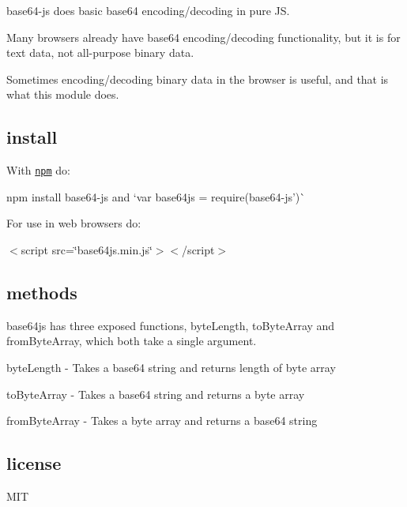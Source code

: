 {\ttfamily base64-\/js} does basic base64 encoding/decoding in pure JS.

\href{http://travis-ci.org/beatgammit/base64-js}{\tt }

Many browsers already have base64 encoding/decoding functionality, but it is for text data, not all-\/purpose binary data.

Sometimes encoding/decoding binary data in the browser is useful, and that is what this module does.

\subsection*{install}

With \href{https://npmjs.org}{\tt npm} do\+:

{\ttfamily npm install base64-\/js} and `var base64js = require(\textquotesingle{}base64-\/js')\`{}

For use in web browsers do\+:

{\ttfamily $<$script src=\char`\"{}base64js.\+min.\+js\char`\"{}$>$$<$/script$>$}

\subsection*{methods}

{\ttfamily base64js} has three exposed functions, {\ttfamily byte\+Length}, {\ttfamily to\+Byte\+Array} and {\ttfamily from\+Byte\+Array}, which both take a single argument.


\begin{DoxyItemize}
\item {\ttfamily byte\+Length} -\/ Takes a base64 string and returns length of byte array
\item {\ttfamily to\+Byte\+Array} -\/ Takes a base64 string and returns a byte array
\item {\ttfamily from\+Byte\+Array} -\/ Takes a byte array and returns a base64 string
\end{DoxyItemize}

\subsection*{license}

M\+IT 